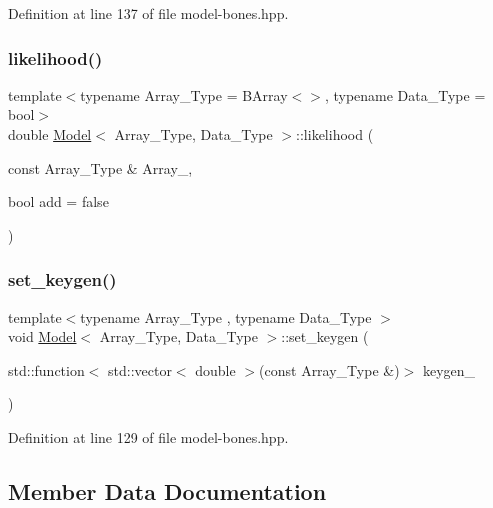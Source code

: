 Definition at line 137 of file model-\/bones.\+hpp.

\mbox{\label{class_model_a9981974cc551be9393c73a0c423a92c0}} 
\subsubsection{\texorpdfstring{likelihood()}{likelihood()}}
{\footnotesize\ttfamily template$<$typename Array\+\_\+\+Type  = B\+Array$<$$>$, typename Data\+\_\+\+Type  = bool$>$ \\
double \hyperlink{class_model}{Model}$<$ Array\+\_\+\+Type, Data\+\_\+\+Type $>$\+::likelihood (\begin{DoxyParamCaption}\item[{const Array\+\_\+\+Type \&}]{Array\+\_\+,  }\item[{bool}]{add = {\ttfamily false} }\end{DoxyParamCaption})}

\mbox{\label{class_model_afa4736153fa419e1f141839eda735dfe}} 
\subsubsection{\texorpdfstring{set\+\_\+keygen()}{set\_keygen()}}
{\footnotesize\ttfamily template$<$typename Array\+\_\+\+Type , typename Data\+\_\+\+Type $>$ \\
void \hyperlink{class_model}{Model}$<$ Array\+\_\+\+Type, Data\+\_\+\+Type $>$\+::set\+\_\+keygen (\begin{DoxyParamCaption}\item[{std\+::function$<$ std\+::vector$<$ double $>$(const Array\+\_\+\+Type \&)$>$}]{keygen\+\_\+ }\end{DoxyParamCaption})\hspace{0.3cm}{\ttfamily [inline]}}



Definition at line 129 of file model-\/bones.\+hpp.



\subsection{Member Data Documentation}
\mbox{\label{class_model_a5af3db8f0635a1aa59519ab94bfd7ebb}} 
